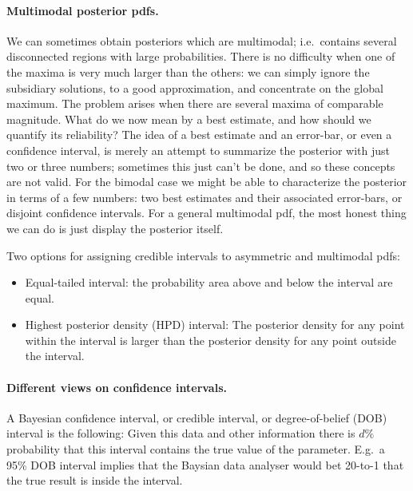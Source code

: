 \documentclass[%
oneside,                 %
final,                   %
10pt]{article}
\newenvironment{block_mdfboxadmon}[1][]{
\begin{block_mdfboxmdframed}[frametitle=#1]
}
{
\end{block_mdfboxmdframed}
}
\begin{document}
\paragraph{Multimodal posterior pdfs.}
We can sometimes obtain posteriors which are multimodal; i.e.~contains several disconnected regions with large probabilities. There is no difficulty when one of the maxima is very much larger than the others: we can simply ignore the subsidiary solutions, to a good approximation, and concentrate on the global maximum. The problem arises when there are several maxima of comparable magnitude. What do we now mean by a best estimate, and how should we quantify its reliability? The idea of a best estimate and an error-bar, or even a confidence interval, is merely an attempt to summarize the posterior with just two or three numbers; sometimes this just can’t be done, and so these concepts are not valid. For the bimodal case we might be able to characterize the posterior in terms of a few numbers: two best estimates and their associated error-bars, or disjoint confidence intervals. For a general multimodal pdf, the most honest thing we can do is just display the posterior itself.


\begin{block_mdfboxadmon}[]
Two options for assigning credible intervals to asymmetric and multimodal pdfs:
\begin{itemize}
\item Equal-tailed interval: the probability area above and below the interval are equal.

\item Highest posterior density (HPD) interval: The posterior density for any point within the interval is larger than the posterior density for any point outside the interval.
\end{itemize}

\noindent
\end{block_mdfboxadmon} %




\paragraph{Different views on confidence intervals.}

\begin{block_mdfboxadmon}[]
A Bayesian confidence interval, or credible interval, or degree-of-belief (DOB) interval is the following: Given this data and other information there is $d \%$ probability that this interval contains the true value of the parameter. E.g.~a 95\% DOB interval implies that the Baysian data analyser would bet 20-to-1 that the true result is inside the interval.
\end{block_mdfboxadmon} %
\end{document}

